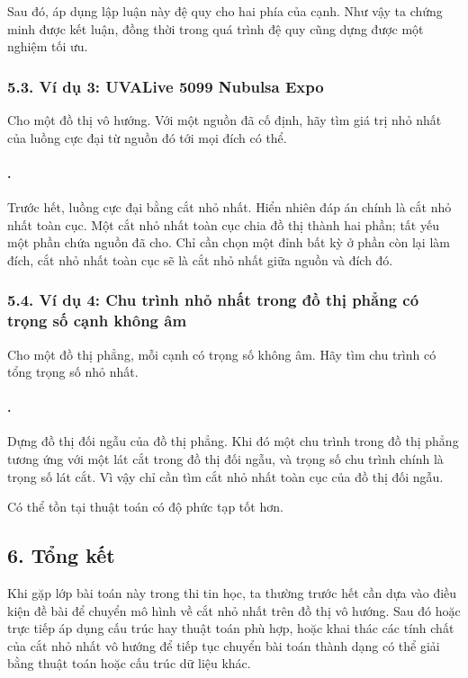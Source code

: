 \documentclass[11pt]{article}
\begin{document}
Sau đó, áp dụng lập luận này đệ quy cho hai phía của cạnh. Như vậy ta chứng
minh được kết luận, đồng thời trong quá trình đệ quy cũng dựng được một
nghiệm tối ưu.

\subsubsection*{5.3. Ví dụ 3: UVALive 5099 Nubulsa Expo}

Cho một đồ thị vô hướng. Với một nguồn đã cố định, hãy tìm giá trị nhỏ nhất
của luồng cực đại từ nguồn đó tới mọi đích có thể.

\paragraph{.}
Trước hết, luồng cực đại bằng cắt nhỏ nhất. Hiển nhiên đáp án chính là cắt
nhỏ nhất toàn cục. Một cắt nhỏ nhất toàn cục chia đồ thị thành hai phần; tất
yếu một phần chứa nguồn đã cho. Chỉ cần chọn một đỉnh bất kỳ ở phần còn lại
làm đích, cắt nhỏ nhất toàn cục sẽ là cắt nhỏ nhất giữa nguồn và đích đó.

\subsubsection*{5.4. Ví dụ 4: Chu trình nhỏ nhất trong đồ thị phẳng có trọng số cạnh không âm}

Cho một đồ thị phẳng, mỗi cạnh có trọng số không âm. Hãy tìm chu trình có
tổng trọng số nhỏ nhất.

\paragraph{.}
Dựng đồ thị đối ngẫu của đồ thị phẳng. Khi đó một chu trình trong đồ thị
phẳng tương ứng với một lát cắt trong đồ thị đối ngẫu, và trọng số chu trình
chính là trọng số lát cắt. Vì vậy chỉ cần tìm cắt nhỏ nhất toàn cục của đồ
thị đối ngẫu.

Có thể tồn tại thuật toán có độ phức tạp tốt hơn.

\subsection*{6. Tổng kết}

Khi gặp lớp bài toán này trong thi tin học, ta thường trước hết cần dựa vào
điều kiện đề bài để chuyển mô hình về cắt nhỏ nhất trên đồ thị vô hướng. Sau
đó hoặc trực tiếp áp dụng cấu trúc hay thuật toán phù hợp, hoặc khai thác các
tính chất của cắt nhỏ nhất vô hướng để tiếp tục chuyển bài toán thành dạng có
thể giải bằng thuật toán hoặc cấu trúc dữ liệu khác.
\end{document}

